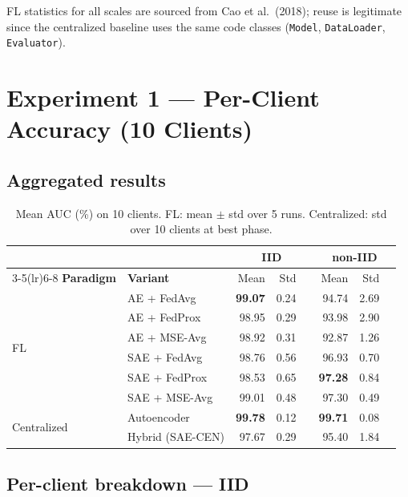 \documentclass[11pt,a4paper]{article}
\begin{document}
FL statistics for all scales are sourced from Cao et al.\ (2018); reuse is
legitimate since the centralized baseline uses the same code classes
(\texttt{Model}, \texttt{DataLoader}, \texttt{Evaluator}).

\newpage
\section{Experiment 1 — Per-Client Accuracy (10 Clients)}

\subsection{Aggregated results}

\begin{table}[ht]
\centering
\caption{Mean AUC (\%) on 10 clients. FL: mean $\pm$ std over 5 runs.
  Centralized: std over 10 clients at best phase.}
\label{tab:exp1-agg}
\small
\begin{tabular}{llrrrrrr}
\toprule
& & \multicolumn{3}{c}{\textbf{IID}} & \multicolumn{3}{c}{\textbf{non-IID}} \\
\cmidrule(lr){3-5}\cmidrule(lr){6-8}
\textbf{Paradigm} & \textbf{Variant} & Mean & Std & & Mean & Std & \\
\midrule
\multirow{6}{*}{FL}
  & AE + FedAvg      & \textbf{99.07} & 0.24 && 94.74 & 2.69 & \\
  & AE + FedProx     & 98.95          & 0.29 && 93.98 & 2.90 & \\
  & AE + MSE-Avg     & 98.92          & 0.31 && 92.87 & 1.26 & \\
  & SAE + FedAvg     & 98.76          & 0.56 && 96.93 & 0.70 & \\
  & SAE + FedProx    & 98.53          & 0.65 && \textbf{97.28} & 0.84 & \\
  & SAE + MSE-Avg    & 99.01          & 0.48 && 97.30 & 0.49 & \\
\midrule
\multirow{2}{*}{Centralized}
  & Autoencoder      & \textbf{99.78} & 0.12 && \textbf{99.71} & 0.08 & \\
  & Hybrid (SAE-CEN) & 97.67          & 0.29 && 95.40          & 1.84 & \\
\bottomrule
\end{tabular}
\end{table}

\subsection{Per-client breakdown — IID}
\end{document}
